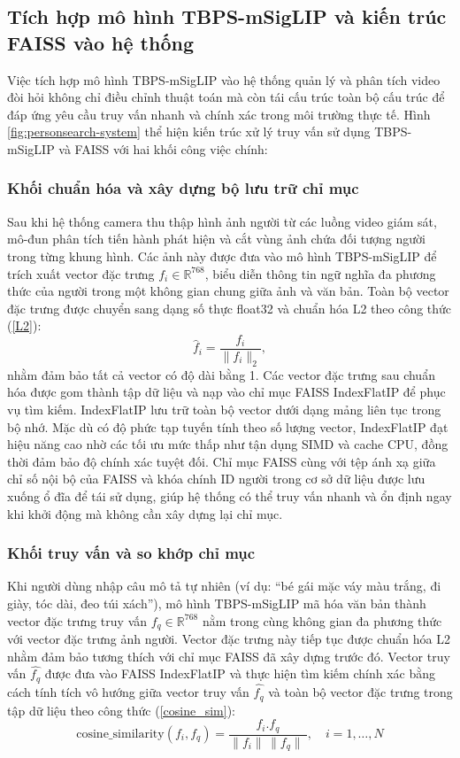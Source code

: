 \documentclass{jstarticle}
\begin{document}
\subsection{Tích hợp mô hình TBPS-mSigLIP và kiến trúc FAISS vào hệ thống}
\label{tichhop}
Việc tích hợp mô hình TBPS-mSigLIP vào hệ thống quản lý và phân tích video đòi hỏi không chỉ điều chỉnh thuật toán mà còn tái cấu trúc toàn bộ cấu trúc để đáp ứng yêu cầu truy vấn nhanh và chính xác trong môi trường thực tế. Hình \ref{fig:personsearch-system} thể hiện kiến trúc xử lý truy vấn sử dụng TBPS-mSigLIP và FAISS với hai khối công việc chính:

\subsubsection{Khối chuẩn hóa và xây dựng bộ lưu trữ chỉ mục}
Sau khi hệ thống camera thu thập hình ảnh người từ các luồng video giám sát, mô-đun phân tích tiến hành phát hiện và cắt vùng ảnh chứa đối tượng người trong từng khung hình. Các ảnh này được đưa vào mô hình TBPS-mSigLIP để trích xuất vector đặc trưng $f_i \in \mathbb{R}^{768}$, biểu diễn thông tin ngữ nghĩa đa phương thức của người trong một không gian chung giữa ảnh và văn bản. Toàn bộ vector đặc trưng được chuyển sang dạng số thực float32 và chuẩn hóa L2 theo công thức (\ref{L2}):
\begin{equation}
 \hat{f}_i = \frac{f_i}{\lVert f_i \rVert_2}, 
\label{L2}   
\end{equation}
nhằm đảm bảo tất cả vector có độ dài bằng 1. Các vector đặc trưng sau chuẩn hóa được gom thành tập dữ liệu và nạp vào chỉ mục FAISS IndexFlatIP để phục vụ tìm kiếm. IndexFlatIP lưu trữ toàn bộ vector dưới dạng mảng liên tục trong bộ nhớ. Mặc dù có độ phức tạp tuyến tính theo số lượng vector, IndexFlatIP đạt hiệu năng cao nhờ các tối ưu mức thấp như tận dụng SIMD và cache CPU, đồng thời đảm bảo độ chính xác tuyệt đối. Chỉ mục FAISS cùng với tệp ánh xạ giữa chỉ số nội bộ của FAISS và khóa chính ID người trong cơ sở dữ liệu được lưu xuống ổ đĩa để tái sử dụng, giúp hệ thống có thể truy vấn nhanh và ổn định ngay khi khởi động mà không cần xây dựng lại chỉ mục.

\subsubsection{Khối truy vấn và so khớp chỉ mục}
Khi người dùng nhập câu mô tả tự nhiên (ví dụ: “bé gái mặc váy màu trắng, đi giày, tóc dài, đeo túi xách”), mô hình TBPS-mSigLIP mã hóa văn bản thành vector đặc trưng truy vấn $f_q \in \mathbb{R}^{768}$ nằm trong cùng không gian đa phương thức với vector đặc trưng ảnh người. Vector đặc trưng này tiếp tục được chuẩn hóa L2 nhằm đảm bảo tương thích với chỉ mục FAISS đã xây dựng trước đó. Vector truy vấn \(\hat{f_q}\) được đưa vào FAISS IndexFlatIP và thực hiện tìm kiếm chính xác bằng cách tính tích vô hướng giữa vector truy vấn \(\hat{f_q}\) và toàn bộ vector đặc trưng trong tập dữ liệu theo công thức (\ref{cosine_sim}):
\begin{equation} 
    \mathrm{cosine\_similarity}(f_i, f_q)
=
\frac{f_i . f_q}{\lVert f_i \rVert \, \lVert f_q \rVert\ }{,\quad i = 1, \ldots, N}
\label{cosine_sim}
\end{equation}
\end{document}
